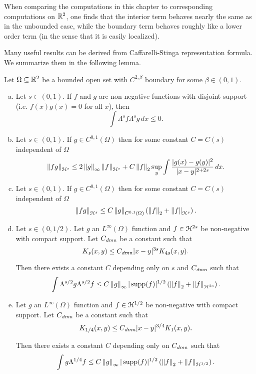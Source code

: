 When comparing the computations in this chapter to corresponding computations on $\mathbb{R}^2$, one finds that the interior term behaves nearly the same as in the unbounded case, while the boundary term behaves roughly like a lower order term (in the sense that it is easily localized).  

Many useful results can be derived from Caffarelli-Stinga representation formula.  We summarize them in the following lemma.  

\begin{lemma} \label{thm:Lambda stuff}
Let $\Omega \subseteq \mathbb{R}^2$ be a bounded open set with $C^{2,\beta}$ boundary for some $\beta \in (0,1)$.  

\begin{enumerate}[(a)]
\item \label{thm:disjoint} Let $s \in (0,1)$.  If $f$ and $g$ are non-negative functions with disjoint support (i.e. $f(x)g(x) = 0$ for all $x$), then 
\[ \int \Lambda^s f \Lambda^s g \,dx \leq 0. \]

\item \label{thm:product rule} Let $s \in (0,1)$.  If $g \in C^{0,1}(\Omega)$ then for some constant $C = C(s)$ independent of $\Omega$
\[ \left\lVert fg\right\rVert_{\mathcal{H}^s} \leq 2 \left\lVert g\right\rVert_\infty \left\lVert f\right\rVert_{\mathcal{H}^s} + C \left\lVert f\right\rVert_2 \sup_y \int \frac{|g(x)-g(y)|^2}{|x-y|^{2+2s}} \,dx. \]

\item \label{thm:extra product rule} Let $s \in (0,1)$.  If $g \in C^{0,1}(\Omega)$ then for some constant $C=C(s)$ independent of $\Omega$
\[  \left\lVert fg\right\rVert_{\mathcal{H}^s} \leq C \left\lVert g\right\rVert_{C^{0,1}(\Omega)} \left( \left\lVert f\right\rVert_2 + \left\lVert f\right\rVert_{\mathcal{H}^s} \right). \]

\item \label{thm:L1 of Lambda bounded} Let $s\in(0,1/2)$.  Let $g$ an $L^\infty(\Omega)$ function and $f \in \mathcal{H}^{2s}$ be non-negative with compact support.  Let $C_\mathit{dmn}$ be a constant such that
\begin{equation} \label{K bounded between orders} K_s(x,y) \leq C_\mathit{dmn} |x-y|^{3s} K_{4s}(x,y). \end{equation}

Then there exists a constant $C$ depending only on $s$ and $C_\mathit{dmn}$ such that
\[ \int \Lambda^{s/2} g \Lambda^{s/2} f \leq C \left\lVert g\right\rVert_\infty |\operatorname{supp}(f)|^{1/2} \left(  \left\lVert f\right\rVert_2 + \left\lVert f\right\rVert_{\mathcal{H}^{2s}} \right). \]

\item \label{thm:L1 of Lambda1/4 bounded} Let $g$ an $L^\infty(\Omega)$ function and $f \in \mathcal{H}^{1/2}$ be non-negative with compact support.  Let $C_\mathit{dmn}$ be a constant such that
\[ K_{1/4}(x,y) \leq C_\mathit{dmn} |x-y|^{3/4} K_{1}(x,y). \]

Then there exists a constant $C$ depending only on $C_\mathit{dmn}$ such that
\[ \int g \Lambda^{1/4} f \leq C \left\lVert g\right\rVert_\infty |\operatorname{supp}(f)|^{1/2} \left(  \left\lVert f\right\rVert_2 + \left\lVert f\right\rVert_{\mathcal{H}^{1/2}} \right). \]

\end{enumerate}
\end{lemma}

